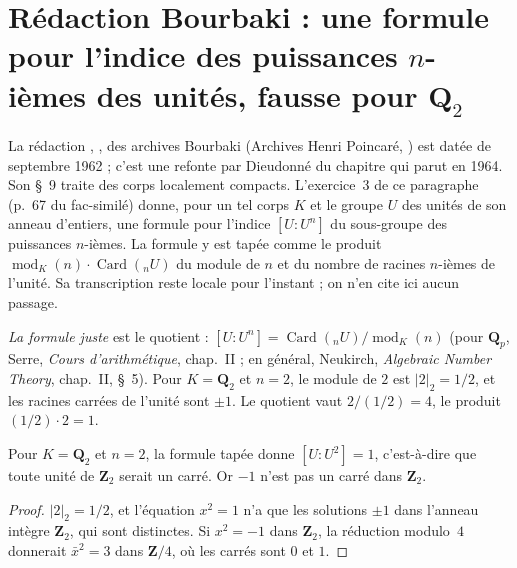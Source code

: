 \section[Rédaction Bourbaki \redac{387} : l'indice des puissances $n$-ièmes]{Rédaction Bourbaki  : une formule pour l'indice des puissances $n$-ièmes des unités, fausse pour $\mathbf Q_2$\protect{}}\label{sec:bourbaki-387}

La rédaction , , des archives Bourbaki (Archives Henri Poincaré, ) est datée de septembre 1962 ; c'est une refonte par Dieudonné du chapitre qui parut en 1964. Son §~9 traite des corps localement compacts. L'exercice~3 de ce paragraphe (p.~67 du fac-similé) donne, pour un tel corps $K$ et le groupe $U$ des unités de son anneau d'entiers, une formule pour l'indice $[U : U^n]$ du sous-groupe des puissances $n$-ièmes. La formule y est tapée comme le produit $\operatorname{mod}_K(n)\cdot \operatorname{Card}({}_nU)$ du module de $n$ et du nombre de racines $n$-ièmes de l'unité. Sa transcription reste locale pour l'instant ; on n'en cite ici aucun passage.

\emph{La formule juste} est le quotient : $[U : U^n] = \operatorname{Card}({}_nU)/\operatorname{mod}_K(n)$ (pour $\mathbf Q_p$, Serre, \emph{Cours d'arithmétique}, chap.~II ; en général, Neukirch, \emph{Algebraic Number Theory}, chap.~II, §~5). Pour $K = \mathbf Q_2$ et $n = 2$, le module de $2$ est $|2|_2 = 1/2$, et les racines carrées de l'unité sont $\pm 1$. Le quotient vaut $2/(1/2) = 4$, le produit $(1/2) \cdot 2 = 1$.

\begin{encadre}
\begin{contrexemple}
Pour $K = \mathbf Q_2$ et $n = 2$, la formule tapée donne $[U : U^2] = 1$, c'est-à-dire que toute unité de $\mathbf Z_2$ serait un carré. Or $-1$ n'est pas un carré dans $\mathbf Z_2$.
\end{contrexemple}
\end{encadre}

\begin{proof}
$|2|_2 = 1/2$, et l'équation $x^2 = 1$ n'a que les solutions $\pm 1$ dans l'anneau intègre $\mathbf Z_2$, qui sont distinctes. Si $x^2 = -1$ dans $\mathbf Z_2$, la réduction modulo~$4$ donnerait $\bar x^2 = 3$ dans $\mathbf Z/4$, où les carrés sont $0$ et $1$.
\end{proof}

